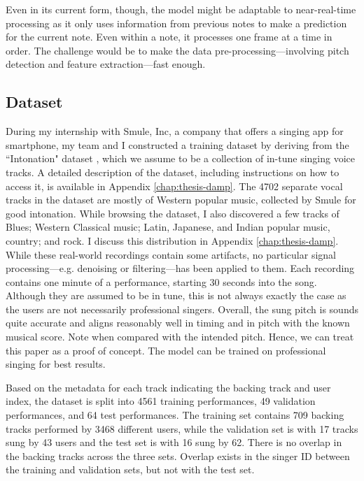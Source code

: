 Even in its current form, though, the model might be adaptable to near-real-time processing as it only uses information from previous notes to make a prediction for the current note. Even within a note, it processes one frame at a time in order. The challenge would be to make the data pre-processing---involving pitch detection and feature extraction---fast enough. 

\subsection{Dataset}
\label{sec:dataset-autotune}
During my internship with Smule, Inc, a company that offers a singing app for smartphone, my team and I constructed a training dataset by deriving from the ``Intonation" dataset \cite{wager2018intonation}, which we assume to be a collection of in-tune singing voice tracks. A detailed description of the dataset, including instructions on how to access it, is available in Appendix \ref{chap:thesis-damp}. The 4702 separate vocal tracks in the dataset are mostly of Western popular music, collected by Smule for good intonation. While browsing the dataset, I also discovered a few tracks of Blues; Western Classical music; Latin, Japanese, and Indian popular music, country; and rock. I discuss this distribution in Appendix \ref{chap:thesis-damp}. While these real-world recordings contain some artifacts, no particular signal processing---e.g. denoising or filtering---has been applied to them. Each recording contains one minute of a performance, starting 30 seconds into the song. Although they are assumed to be in tune, this is not always exactly the case as the users are not necessarily professional singers. Overall, the sung pitch is sounds quite accurate and aligns reasonably well in timing and in pitch with the known musical score. Note when compared with the intended pitch. Hence, we can treat this paper as a proof of concept. The model can be trained on professional singing for best results.

Based on the metadata for each track indicating the backing track and user index, the dataset is split into 4561 training performances, 49 validation performances, and 64 test performances. The training set contains 709 backing tracks performed by 3468 different users, while the validation set is with 17 tracks sung by 43 users and the test set is with 16 sung by 62. There is no overlap in the backing tracks across the three sets. Overlap exists in the singer ID between the training and validation sets, but not with the test set. 

